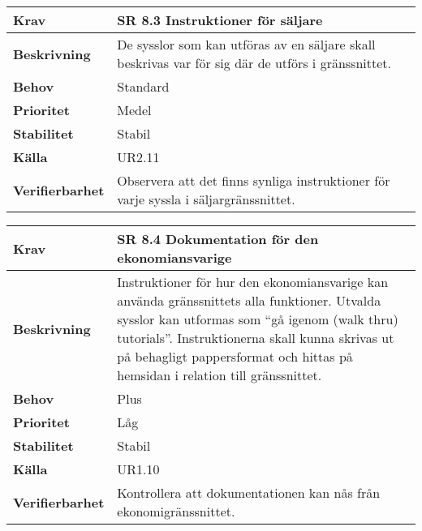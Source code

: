 \documentclass[a4paper, twoside, 11pt, titlepage]{article}
\begin{document}
	\begin{tabular} { p{2.6cm} p{12.5cm} }
		\hline
		\sffamily\textbf{Krav} & \sffamily\textbf{SR 8.3 Instruktioner för säljare } \\
		\hline
		\sffamily\textbf{Beskrivning} & De sysslor som kan utföras av en säljare skall beskrivas var för sig där de utförs i gränssnittet.  \\
		\hline
		\sffamily\textbf{Behov} & Standard  \\
		\hline
		\sffamily\textbf{Prioritet} & Medel  \\
		\hline
		\sffamily\textbf{Stabilitet} & Stabil  \\
		\hline
		\sffamily\textbf{Källa} & UR2.11  \\
		\hline
		\sffamily\textbf{Verifierbarhet} & Observera att det finns synliga instruktioner för varje syssla i säljargränssnittet.  \\
		\hline
	\end{tabular}
	\vspace{6mm}

	\begin{tabular} { p{2.6cm} p{12.5cm} }
		\hline
		\sffamily\textbf{Krav} & \sffamily\textbf{SR 8.4 Dokumentation för den ekonomiansvarige } \\
		\hline
		\sffamily\textbf{Beskrivning} & Instruktioner för hur den ekonomiansvarige kan använda gränssnittets alla funktioner. Utvalda sysslor kan utformas som ``gå igenom (walk thru) tutorials''. Instruktionerna skall kunna skrivas ut på behagligt pappersformat och hittas på hemsidan i relation till gränssnittet.  \\
		\hline
		\sffamily\textbf{Behov} & Plus  \\
		\hline
		\sffamily\textbf{Prioritet} & Låg  \\
		\hline
		\sffamily\textbf{Stabilitet} & Stabil  \\
		\hline
		\sffamily\textbf{Källa} & UR1.10  \\
		\hline
		\sffamily\textbf{Verifierbarhet} & Kontrollera att dokumentationen kan nås från ekonomigränssnittet.  \\
		\hline
	\end{tabular}
	\vspace{6mm}
\end{document}
